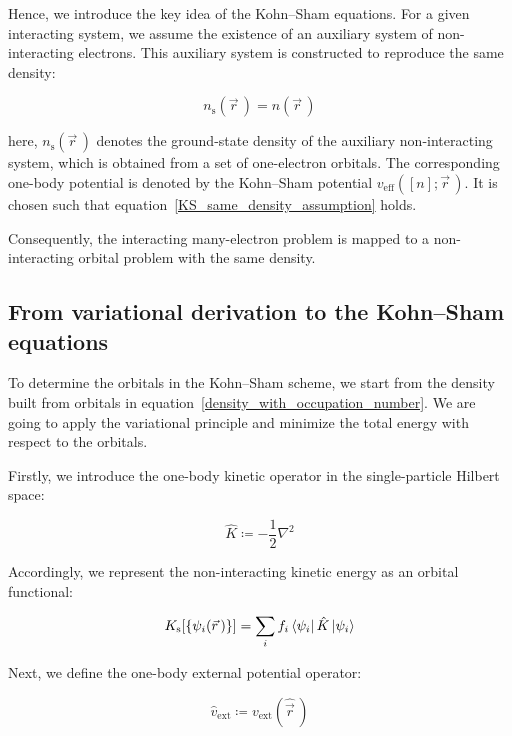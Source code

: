 Hence, we introduce the key idea of the Kohn--Sham equations.
For a given interacting system, we assume the existence of an auxiliary system of non-interacting electrons.
This auxiliary system is constructed to reproduce the same density:

\begin{equation}
    n_\mathrm{s}(\vec{r}\,)=n(\vec{r}\,)
\label{KS_same_density_assumption}
\end{equation}

here, $n_\mathrm{s}(\vec{r}\,)$ denotes the ground-state density of the auxiliary non-interacting system,
which is obtained from a set of one-electron orbitals.
The corresponding one-body potential is denoted by the Kohn--Sham potential $v_\mathrm{eff}([n];\vec{r}\,)$.
It is chosen such that equation~\eqref{KS_same_density_assumption} holds.

Consequently, the interacting many-electron problem is mapped to a non-interacting orbital problem with the same density.

\subsection{From variational derivation to the Kohn--Sham equations}
\label{subsec:KS_variational_derivation}

To determine the orbitals in the Kohn--Sham scheme,
we start from the density built from orbitals in equation~\eqref{density_with_occupation_number}.
We are going to apply the variational principle and minimize the total energy with respect to the orbitals.

Firstly, we introduce the one-body kinetic operator in the single-particle Hilbert space:

\begin{equation}
    \hat{K}\coloneqq
    -\frac{1}{2}\nabla^2
\label{KS_one_body_kinetic_operator_definition}
\end{equation}

Accordingly, we represent the non-interacting kinetic energy as an orbital functional:

\begin{equation}
    K_\mathrm{s}[\{\psi_i(\vec{r}\,)\}]=
    \sum_i f_i \bra{\psi_i}\hat{K}\ket{\psi_i}
\label{KS_noninteracting_kinetic_energy_orbital_functional}
\end{equation}

Next, we define the one-body external potential operator:

\begin{equation}
    \hat{v}_\mathrm{ext}\coloneqq
    v_\mathrm{ext}(\hat{\vec{r}}\,)
\label{KS_one_body_external_operator_definition}
\end{equation}

